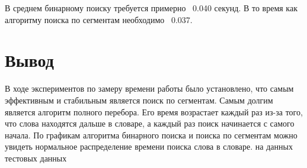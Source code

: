         В среднем бинарному поиску требуется примерно ~0.040 секунд.
        В то время как алгоритму поиска по сегментам
        необходимо ~0.037. 

    \section{Вывод}
        В ходе экспериментов по замеру времени работы было установлено, что 
        самым эффективным и стабильным является поиск по сегментам.
        Самым долгим является алгоритм полного перебора.
        Его время возрастает каждый раз из-за того, 
        что слова находятся дальше в словаре, 
        а каждый раз поиск начинается с самого начала. 
        По графикам алгоритма бинарного поиска и поиска по сегментам 
        можно увидеть нормальное распределение времени поиска слова в словаре.
        на данных тестовых данных 

\newpage